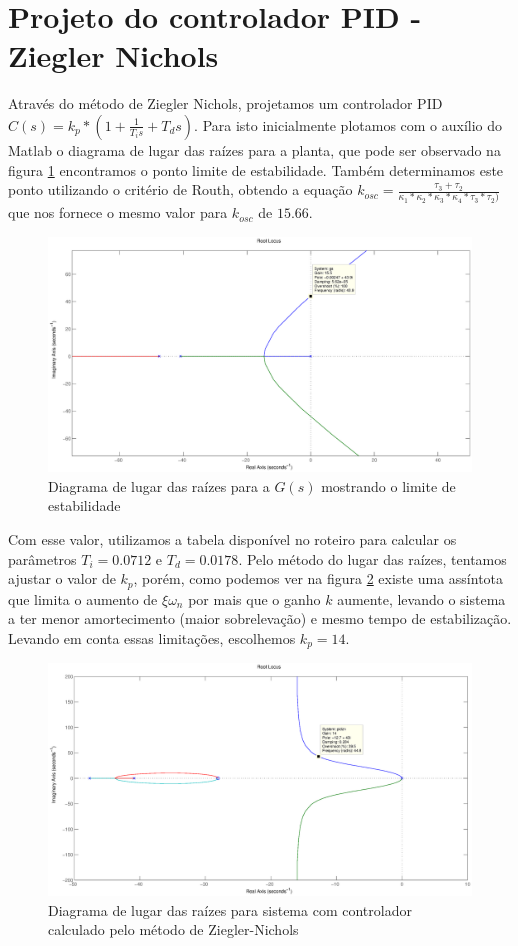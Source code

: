 \documentclass{article}
\begin{document}
\section{Projeto do controlador PID - Ziegler Nichols}
Através do método de Ziegler Nichols, projetamos um controlador PID $C(s) = k_p*(1 + \frac{1}{T_is} + T_ds)$. Para isto inicialmente plotamos com o auxílio do Matlab o diagrama de lugar das raízes para a planta, que pode ser observado na figura \ref{fig:rlocuslim} encontramos o ponto limite de estabilidade. Também determinamos este ponto utilizando o critério de Routh, obtendo a equação $k_{osc} = \frac{\tau_3 + \tau_2}{\kappa_1*\kappa_2*\kappa_3*\kappa_4*\tau_3*\tau_2)}$ que nos fornece o mesmo valor para $k_{osc}$ de $15.66$.
\begin{figure}[H]
  	\centering
  	\includegraphics[width=\linewidth]{rlocuslim}
  	\caption{Diagrama de lugar das raízes para a $G(s)$ mostrando o limite de estabilidade}
  	\label{fig:rlocuslim}
\end{figure}
Com esse valor, utilizamos a tabela disponível no roteiro \cite{bb:roteiro} para calcular os parâmetros $T_i = 0.0712$ e $T_d = 0.0178$.
Pelo método do lugar das raízes, tentamos ajustar o valor de $k_p$, porém, como podemos ver na figura \ref{fig:rlocuspidzn} existe uma assíntota que limita o aumento de $\xi \omega_n$ por mais que o ganho $k$ aumente, levando o sistema a ter menor amortecimento (maior sobrelevação) e mesmo tempo de estabilização. Levando em conta essas limitações, escolhemos $k_p = 14$.
\begin{figure}[H]
	\centering
	\includegraphics[width=\linewidth]{rlocuspidzn}
	\caption{Diagrama de lugar das raízes para sistema com controlador calculado pelo método de Ziegler-Nichols}
	\label{fig:rlocuspidzn}
\end{figure}
\end{document}
